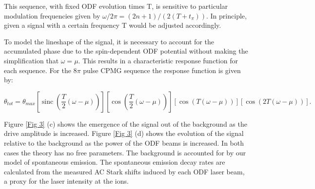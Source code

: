 \documentclass[aps,prl,twocolumn,superscriptaddress,floatfix]{revtex4-1}
\DeclareMathOperator{\sinc}{sinc}
\begin{document}
This sequence, with fixed ODF evolution times T, is sensitive to particular modulation frequencies given by $ \omega/2\pi = (2n+1)/(2(T+t_{\pi}))$. In principle, given a signal with a certain frequency T would be adjusted accordingly.

To model the lineshape of the signal, it is necessary to account for the accumulated phase due to the spin-dependent ODF potential without making the simplification that $ \omega = \mu $. This results in a characteristic response function for each sequence. For the 8$\pi$ pulse CPMG sequence the response function is given by:

\begin{widetext}
\begin{equation}
\theta_{tot} = \theta_{max} \left[ \sinc \left( \frac{T}{2} \left( \omega-\mu \right) \right) \right] 
\left[ \cos \left( \frac{T}{2} \left( \omega - \mu \right) \right) \right] \left[ \cos(T(\omega - \mu)) \right] \left[ \cos(2T(\omega - \mu)) \right] .
\end{equation}
\end{widetext}
Figure \ref{Fig 3} (c) shows the emergence of the signal out of the background as the drive amplitude is increased. Figure \ref{Fig 3} (d) shows the evolution of the signal relative to the background as the power of the ODF beams is increased. In both cases the theory has no free parameters. The background is accounted for by our model of spontaneous emission. The spontaneous emission decay rates are calculated from the measured AC Stark shifts induced by each ODF laser beam, a proxy for the laser intensity at the ions.
\end{document}
